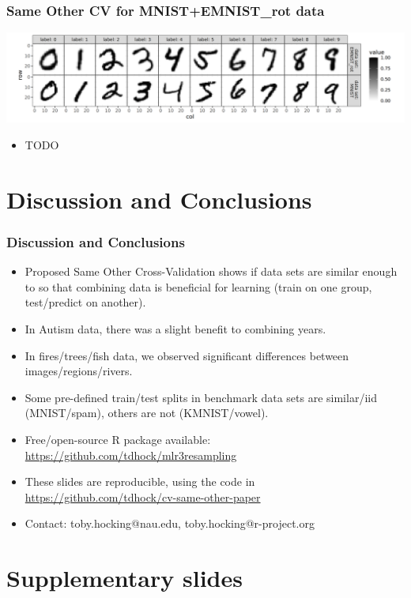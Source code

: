 \documentclass{beamer}
\begin{document}
\begin{frame}
  \frametitle{Same Other CV for MNIST+EMNIST\_rot data}

  \includegraphics[width=\textwidth]{data_Classif_MNIST_other_EMNIST_rot.png}
  
  \begin{itemize}
  \item TODO
  \end{itemize}
\end{frame}

\section{Discussion and Conclusions}

\begin{frame}
  \frametitle{Discussion and Conclusions}
  \begin{itemize}
  \item Proposed Same Other Cross-Validation shows if
    data sets are similar enough to so that combining data is
    beneficial for learning (train on one group, test/predict on
    another).
  \item In Autism data, there was a slight benefit to combining years.
  \item In fires/trees/fish data, we observed
    significant differences between images/regions/rivers.
  \item Some pre-defined train/test splits in benchmark data sets
    are similar/iid (MNIST/spam), others are not (KMNIST/vowel).
  \item Free/open-source R package available:
    \url{https://github.com/tdhock/mlr3resampling}
  \item These slides are reproducible, using the code in \url{https://github.com/tdhock/cv-same-other-paper}
  \item Contact: toby.hocking@nau.edu,
    toby.hocking@r-project.org
  \end{itemize}
\end{frame}

\section{Supplementary slides}
\end{document}
